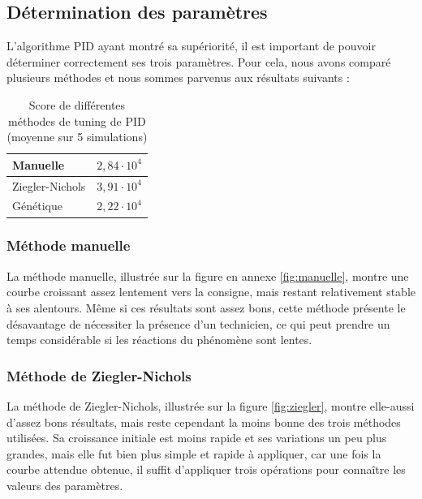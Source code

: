 \documentclass[a4paper,10pt]{report}
\begin{document}
\subsection{Détermination des paramètres}
L'algorithme PID ayant montré sa supériorité, il est important de pouvoir déterminer correctement ses trois paramètres.
Pour cela, nous avons comparé plusieurs méthodes et nous sommes parvenus aux résultats suivants :

\begin{table}[H]
\begin{center}
    \begin{tabular}{|l|l|}
        \hline
        Manuelle & $2,84 \cdot 10^4$ \\ \hline
        Ziegler-Nichols & $3,91 \cdot 10^4$ \\ \hline
        Génétique        & $2,22 \cdot 10^4$ \\ \hline
    \end{tabular}
\end{center}
\caption{Score de différentes méthodes de tuning de PID (moyenne sur 5 simulations)}

\end{table}

\subsubsection{Méthode manuelle}

La méthode manuelle, illustrée sur la figure en annexe \ref{fig:manuelle}, montre une courbe croissant assez lentement vers la consigne, mais restant relativement stable à ses alentours. Même si ces résultats sont assez bons, cette méthode présente le désavantage de nécessiter la présence d'un technicien, ce qui peut prendre un temps considérable si les réactions du phénomène sont lentes.

\subsubsection{Méthode de Ziegler-Nichols}

La méthode de Ziegler-Nichols, illustrée sur la figure \ref{fig:ziegler}, montre elle-aussi d'assez bons résultats, mais reste cependant la moins bonne des trois méthodes utilisées.
Sa croissance initiale est moins rapide et ses variations un peu plus grandes, mais elle fut bien plus simple et rapide à appliquer, car une fois la courbe attendue obtenue, il suffit d'appliquer trois opérations pour connaître les valeurs des paramètres.
\end{document}
